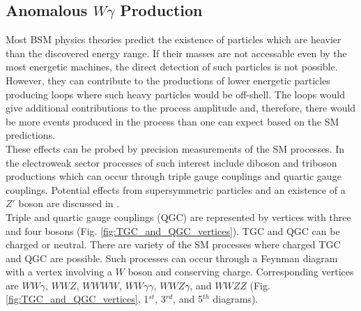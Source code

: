 \subsection{Anomalous $W\gamma$ Production}
\label{sec:WgAbout_ATGC}

Most BSM physics theories predict the existence of particles which are heavier than the discovered energy range. If their masses are not accessable even by the most energetic machines, the direct detection of such particles is not possible. However, they can contribute to the productions of lower energetic particles producing loops where such heavy particles would be off-shell. The loops would give additional contributions to the process amplitude and, therefore, there would be more events produced in the process than one can expect based on the SM predictions.\\

These effects can be probed by precision measurements of the SM processes. In the electroweak sector processes of such interest include diboson and triboson productions which can occur through triple gauge couplings and quartic gauge couplings. Potential effects from supersymmetric particles and an existence of a $Z'$ boson are discussed in \cite{ref_theory_aTGC}.\\

Triple and quartic gauge couplings (QGC) are represented by vertices with three and four bosons (Fig. \ref{fig:TGC_and_QGC_vertices}). TGC and QGC can be charged or neutral. There are variety of the SM processes where charged TGC and QGC are possible. Such processes can occur through a Feynman diagram with a vertex involving a $W$ boson and conserving charge. Corresponding vertices are $WW\gamma$, $WWZ$, $WWWW$, $WW\gamma\gamma$, $WWZ\gamma$, and $WWZZ$ (Fig. \ref{fig:TGC_and_QGC_vertices}, 1$^{st}$, 3$^{rd}$, and 5$^{th}$ diagrams).\\ 




